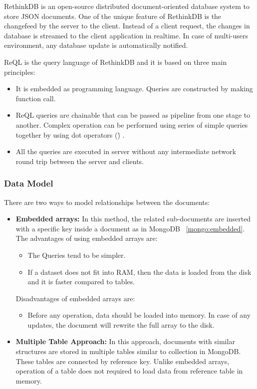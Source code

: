 RethinkDB is an open-source distributed document-oriented database system to store JSON documents. One of the unique feature of RethinkDB is the changefeed by the server to the client. 
Instead of a client request, the changes in database is streamed to the client application in realtime. In case of multi-users environment, any database  update is automatically notified.
\par
ReQL is the query language  of RethinkDB and it is based on three main principles:
 \begin{itemize}
 \item  It is  embedded  as programming language. Queries are constructed by making function call. 
 \item ReQL queries are chainable that can be passed as pipeline from one stage to another. Complex operation can be performed using series of simple queries together by using dot operators (\.) . 
 \item All the queries are executed in server without any intermediate network round trip between the server and clients.
 \end{itemize}
  
\subsubsection{Data Model}
There are two ways to model relationships between the documents: 
\begin{itemize}
	\item \textbf{Embedded arrays:} In this method, the related sub-documents are inserted with a specific key inside a document as in MongoDB ~\ref{mongo:embedded}. The advantages of using embedded arrays are:
		\begin{itemize}
			\item The Queries tend to be simpler. 
			\item If a dataset  does not fit into RAM, then the data is loaded  from the disk and it is faster compared to tables. 
		\end{itemize}
		Disadvantages of embedded arrays are: 
		\begin{itemize}
			\item Before any operation, data should be loaded into memory. In case of any updates, the document will rewrite the full array to the disk.
		\end{itemize}
		
	\item 
	\textbf{Multiple Table Approach:} In this approach, documents with similar structures are stored in multiple tables similar to collection in MongoDB. These tables are connected by reference key. Unlike embedded arrays, operation of a table does not required to load data from reference table in memory.
\end{itemize}

